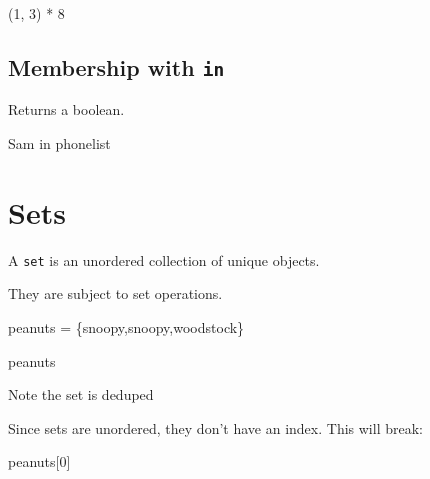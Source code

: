\documentclass[
  letterpaper,
  DIV=11,
  numbers=noendperiod]{scrreprt}
\newenvironment{Shaded}{\begin{snugshade}}{\end{snugshade}}
\newcommand{\CommentTok}[1]{\textcolor[rgb]{0.37,0.37,0.37}{#1}}
\newcommand{\DecValTok}[1]{\textcolor[rgb]{0.68,0.00,0.00}{#1}}
\newcommand{\KeywordTok}[1]{\textcolor[rgb]{0.00,0.23,0.31}{#1}}
\newcommand{\NormalTok}[1]{\textcolor[rgb]{0.00,0.23,0.31}{#1}}
\newcommand{\OperatorTok}[1]{\textcolor[rgb]{0.37,0.37,0.37}{#1}}
\newcommand{\StringTok}[1]{\textcolor[rgb]{0.13,0.47,0.30}{#1}}
\begin{document}
\begin{Shaded}
\begin{Highlighting}[]
\NormalTok{(}\DecValTok{1}\NormalTok{, }\DecValTok{3}\NormalTok{) }\OperatorTok{*} \DecValTok{8}
\end{Highlighting}
\end{Shaded}

\hypertarget{membership-with-in-1}{%
\section{\texorpdfstring{Membership with
\texttt{in}}{Membership with in}}\label{membership-with-in-1}}

Returns a boolean.

\begin{Shaded}
\begin{Highlighting}[]
\CommentTok{\textquotesingle{}Sam\textquotesingle{}} \KeywordTok{in}\NormalTok{ phonelist}
\end{Highlighting}
\end{Shaded}

\hypertarget{sets-1}{%
\chapter{Sets}\label{sets-1}}

A \texttt{set} is an unordered collection of unique objects.

They are subject to set operations.

\begin{Shaded}
\begin{Highlighting}[]
\NormalTok{peanuts }\OperatorTok{=}\NormalTok{ \{}\StringTok{\textquotesingle{}snoopy\textquotesingle{}}\NormalTok{,}\StringTok{\textquotesingle{}snoopy\textquotesingle{}}\NormalTok{,}\StringTok{\textquotesingle{}woodstock\textquotesingle{}}\NormalTok{\}}
\end{Highlighting}
\end{Shaded}

\begin{Shaded}
\begin{Highlighting}[]
\NormalTok{peanuts}
\end{Highlighting}
\end{Shaded}

Note the set is deduped

Since sets are unordered, they don't have an index. This will break:

\begin{Shaded}
\begin{Highlighting}[]
\NormalTok{peanuts[}\DecValTok{0}\NormalTok{]}
\end{Highlighting}
\end{Shaded}
\end{document}
